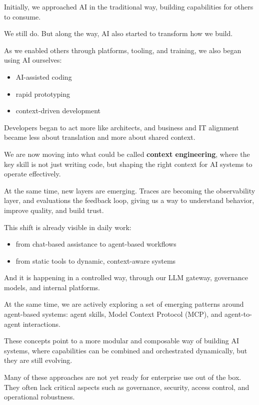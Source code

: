 \documentclass[11pt]{article}
\begin{document}
Initially, we approached AI in the traditional way, building capabilities for others to consume.

We still do. But along the way, AI also started to transform how we build.

As we enabled others through platforms, tooling, and training, we also began using AI ourselves:

\begin{itemize}
\item AI-assisted coding
\item rapid prototyping
\item context-driven development
\end{itemize}

Developers began to act more like architects, and business and IT alignment became less about translation and more about shared context.

We are now moving into what could be called \textbf{context engineering}, where the key skill is not just writing code, but shaping the right context for AI systems to operate effectively.

At the same time, new layers are emerging. Traces are becoming the observability layer, and evaluations the feedback loop, giving us a way to understand behavior, improve quality, and build trust.

This shift is already visible in daily work:

\begin{itemize}
\item from chat-based assistance to agent-based workflows
\item from static tools to dynamic, context-aware systems
\end{itemize}

And it is happening in a controlled way, through our LLM gateway, governance models, and internal platforms.

At the same time, we are actively exploring a set of emerging patterns around agent-based systems: agent skills, Model Context Protocol (MCP), and agent-to-agent interactions.

These concepts point to a more modular and composable way of building AI systems, where capabilities can be combined and orchestrated dynamically, but they are still evolving.

Many of these approaches are not yet ready for enterprise use out of the box. They often lack critical aspects such as governance, security, access control, and operational robustness.
\end{document}
